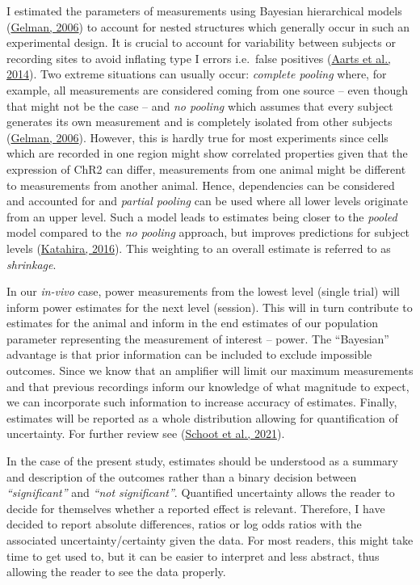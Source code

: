 \documentclass[
  12pt,
  a4paper,
  openany]{book}
\begin{document}
I estimated the parameters of measurements using Bayesian hierarchical models (\protect\hyperlink{ref-gelman_multilevel_2006}{Gelman, 2006}) to account for nested structures which generally occur in such an experimental design. It is crucial to account for variability between subjects or recording sites to avoid inflating type I errors i.e.~false positives (\protect\hyperlink{ref-aarts_solution_2014}{Aarts et al., 2014}). Two extreme situations can usually occur: \emph{complete pooling} where, for example, all measurements are considered coming from one source -- even though that might not be the case -- and \emph{no pooling} which assumes that every subject generates its own measurement and is completely isolated from other subjects (\protect\hyperlink{ref-gelman_multilevel_2006}{Gelman, 2006}). However, this is hardly true for most experiments since cells which are recorded in one region might show correlated properties given that the expression of ChR2 can differ, measurements from one animal might be different to measurements from another animal. Hence, dependencies can be considered and accounted for and \emph{partial pooling} can be used where all lower levels originate from an upper level. Such a model leads to estimates being closer to the \emph{pooled} model compared to the \emph{no pooling} approach, but improves predictions for subject levels (\protect\hyperlink{ref-katahira_how_2016}{Katahira, 2016}). This weighting to an overall estimate is referred to as \emph{shrinkage}.

In our \emph{in-vivo} case, power measurements from the lowest level (single trial) will inform power estimates for the next level (session). This will in turn contribute to estimates for the animal and inform in the end estimates of our population parameter representing the measurement of interest -- power. The ``Bayesian'' advantage is that prior information can be included to exclude impossible outcomes. Since we know that an amplifier will limit our maximum measurements and that previous recordings inform our knowledge of what magnitude to expect, we can incorporate such information to increase accuracy of estimates. Finally, estimates will be reported as a whole distribution allowing for quantification of uncertainty. For further review see (\protect\hyperlink{ref-van_de_schoot_bayesian_2021}{Schoot et al., 2021}).

In the case of the present study, estimates should be understood as a summary and description of the outcomes rather than a binary decision between \emph{``significant''} and \emph{``not significant''}. Quantified uncertainty allows the reader to decide for themselves whether a reported effect is relevant. Therefore, I have decided to report absolute differences, ratios or log odds ratios with the associated uncertainty/certainty given the data. For most readers, this might take time to get used to, but it can be easier to interpret and less abstract, thus allowing the reader to see the data properly.
\end{document}
